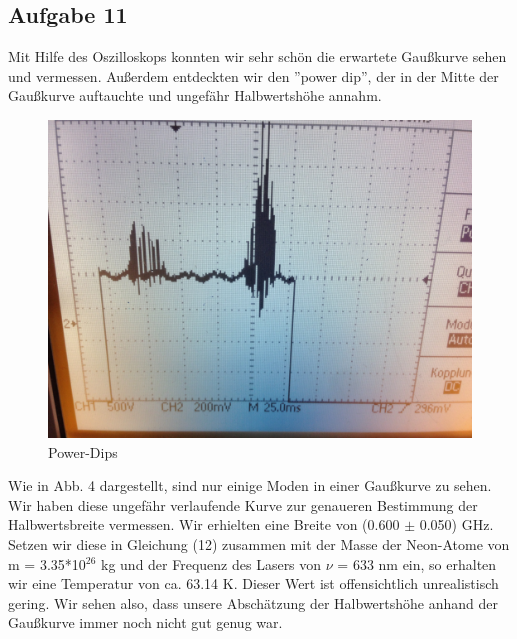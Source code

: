 \subsection{Aufgabe 11}

Mit Hilfe des Oszilloskops konnten wir sehr schön die erwartete Gaußkurve sehen und vermessen. Außerdem entdeckten wir den ''power dip'', der in der Mitte der Gaußkurve auftauchte und ungefähr Halbwertshöhe annahm. 

\begin{figure}[here]
\centering
\includegraphics[scale=0.1]{img/62}
\caption{Power-Dips}
\begin{center}
\end{center}
\end{figure}

Wie in Abb. 4 dargestellt, sind nur einige Moden in einer Gaußkurve zu sehen. Wir haben diese ungefähr verlaufende Kurve zur genaueren Bestimmung der Halbwertsbreite vermessen. Wir erhielten eine Breite von (0.600 $\pm$ 0.050) GHz. Setzen wir diese in Gleichung (12) zusammen mit der Masse der Neon-Atome von m = 3.35*10$^{26}$ kg und der Frequenz des Lasers von $\nu$ = 633 nm ein, so erhalten wir eine Temperatur von ca. 63.14 K. Dieser Wert ist offensichtlich unrealistisch gering. Wir sehen also, dass unsere Abschätzung der Halbwertshöhe anhand der Gaußkurve immer noch nicht gut genug war.
